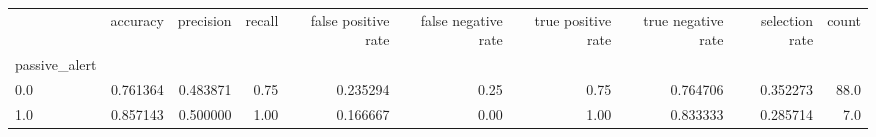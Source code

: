 \begin{tabular}{lrrrrrrrrr}
\toprule
{} &  accuracy &  precision &  recall &  false positive rate &  false negative rate &  true positive rate &  true negative rate &  selection rate &  count \\
passive\_alert &           &            &         &                      &                      &                     &                     &                 &        \\
\midrule
0.0           &  0.761364 &   0.483871 &    0.75 &             0.235294 &                 0.25 &                0.75 &            0.764706 &        0.352273 &   88.0 \\
1.0           &  0.857143 &   0.500000 &    1.00 &             0.166667 &                 0.00 &                1.00 &            0.833333 &        0.285714 &    7.0 \\
\bottomrule
\end{tabular}
